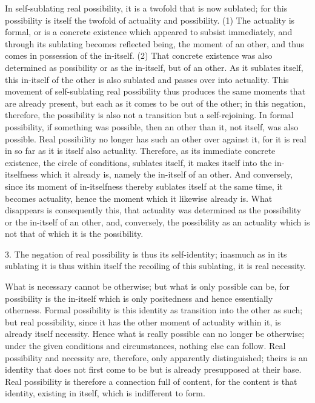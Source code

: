 In self-sublating real possibility,
it is a twofold that is now sublated;
for this possibility is itself
the twofold of actuality and possibility.
(1) The actuality is formal,
 or is a concrete existence
which appeared to subsist immediately,
and through its sublating becomes reflected being,
the moment of an other,
and thus comes in possession of the in-itself.
(2) That concrete existence was also determined
as possibility or as the in-itself, but of an other.
As it sublates itself, this in-itself of the other is
also sublated and passes over into actuality.
This movement of self-sublating real possibility
thus produces the same moments that are already present,
but each as it comes to be out of the other;
in this negation, therefore, the possibility
is also not a transition but a self-rejoining.
In formal possibility, if something was possible,
then an other than it, not itself, was also possible.
Real possibility no longer has such an other over against it,
for it is real in so far as it is itself also actuality.
Therefore, as its immediate concrete existence,
the circle of conditions, sublates itself,
it makes itself into the in-itselfness which it already is,
namely the in-itself of an other.
And conversely, since its moment of in-itselfness
thereby sublates itself at the same time,
it becomes actuality, hence the moment
which it likewise already is.
What disappears is consequently this,
that actuality was determined as the possibility
or the in-itself of an other,
and, conversely, the possibility as an actuality
which is not that of which it is the possibility.

3. The negation of real possibility is thus its self-identity;
inasmuch as in its sublating it is thus within itself
the recoiling of this sublating, it is real necessity.

What is necessary cannot be otherwise;
but what is only possible can be,
for possibility is the in-itself
which is only positedness
and hence essentially otherness.
Formal possibility is this identity
as transition into the other as such;
but real possibility, since it has
the other moment of actuality within it,
is already itself necessity.
Hence what is really possible can no longer be otherwise;
under the given conditions and circumstances,
nothing else can follow.
Real possibility and necessity are, therefore,
only apparently distinguished;
theirs is an identity that does not first come to be
but is already presupposed at their base.
Real possibility is therefore a connection full of content,
for the content is that identity, existing in itself,
which is indifferent to form.

